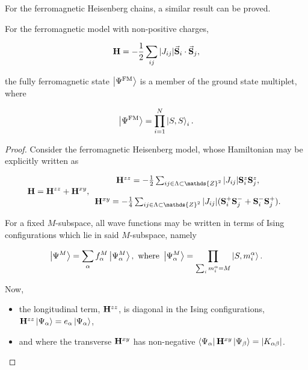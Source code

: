 \documentclass{homework}
\begin{document}
For the ferromagnetic Heisenberg chains, a similar result can be proved. 

\begin{corr}
\label{Ferromagnetic_Marshall_theo}
For the ferromagnetic model with non-positive charges, 

$$
{\bf H} = - \frac{1}{2} \sum_{ij} |J_{ij}| \vec{{\bf S}}_i \cdot \vec{{\bf S}}_j,
$$

the fully ferromagnetic state $\ket{\Psi^{\textnormal{FM}}}$ is a member of the ground state multiplet, where 

$$
    \ket{\Psi^{\textnormal{FM}}} = \prod_{i=1}^N \ket{S, S}_i.
$$

\end{corr}

\begin{proof}

Consider the ferromagnetic Heisenberg model, whose Hamiltonian may be explicitly written as 

\begin{equation}
     {\bf H} = {\bf H}^{zz} + {\bf H}^{xy}, \begin{array}{c}
         {\bf H}^{zz} = -\frac{1}{2} \sum_{ij \in \Lambda \subset \mathds{Z}^{2}} |J_{ij}| \spin_i^z \spin_j^z, \\  
         \\
         {\bf H}^{xy} = -\frac{1}{4} \sum_{ij \in \Lambda \subset \mathds{Z}^{2}} |J_{ij}| (\spin_i^+ \spin_j^- + \spin_i^- \spin_j^+). \\  
    \end{array}
\end{equation}

For a fixed $M$-subspace, all wave functions may be written in terms of Ising configurations which lie in said $M$-subspace, namely

\begin{equation}
    \ket{\Psi^M} = \sum_{\alpha} f_{\alpha}^M \ket{{\Psi}^M_{\alpha}}, \textnormal{ where } \ket{{\Psi}^M_{\alpha}} = \prod_{\sum_{i} {m}_i^\alpha = M} \ket{S, {m}_i^\alpha}. 
\end{equation}

Now, 

\begin{itemize}
    \item the longitudinal term, ${{\bf H}}^{zz}$, is diagonal in the Ising configurations, ${{\bf H}}^{zz}\ket{{\Psi}_{\alpha}} = e_{\alpha} \ket{{\Psi}_{\alpha}}$,
    \item and where the transverse ${{\bf H}}^{xy}$ has non-negative $\bra{{\Psi}_{\alpha}} {{\bf H}}^{xy}  \ket{{\Psi}_{\beta}} = |K_{\alpha \beta}|$.
\end{itemize}


\end{proof}
\end{document}
